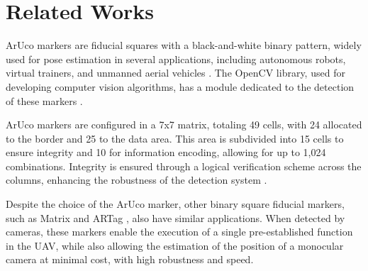 \documentclass[letterpaper]{article}
\begin{document}



\section{Related Works}
ArUco markers are fiducial squares with a black-and-white binary pattern, widely used for pose estimation in several applications, including autonomous robots, virtual trainers, and unmanned aerial vehicles \cite{Bacik2017} \cite{Yang2018} \cite{hansen2024active}. The OpenCV library, used for developing computer vision algorithms, has a module dedicated to the detection of these markers \cite{Romero-Ramirez2019}. %

ArUco markers are configured in a 7x7 matrix, totaling 49 cells, with 24 allocated to the border and 25 to the data area. This area is subdivided into 15 cells to ensure integrity and 10 for information encoding, allowing for up to 1,024 combinations. Integrity is ensured through a logical verification scheme across the columns, enhancing the robustness of the detection system \cite{silva2014evaluation}. %

Despite the choice of the ArUco marker, other binary square fiducial markers, such as Matrix \cite{rekimoto1998matrix} and ARTag \cite{fiala2010designing}, also have similar applications. When detected by cameras, these markers enable the execution of a single pre-established function in the UAV, while also allowing the estimation of the position of a monocular camera at minimal cost, with high robustness and speed.
\end{document}
